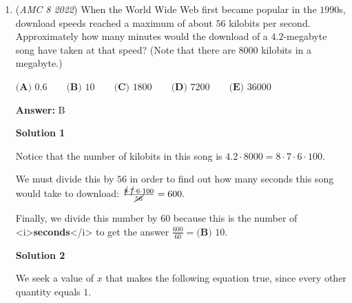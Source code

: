 \begin{enumerate}
Let the smallest number be $x$. Because $x$ and $4x$ are equally spaced from $15$, $15$ must be the average. By adding $x$ and $4x$ and dividing by $2$, we get that the mean is also $2.5x$. We get that $2.5x=15$, and solving gets $x=\boxed{\textbf{(C) } 6}$.

 



\textbf{Solution 4}

Since the problem is giving us the options, we can try all of them. The differences MUST be equal because the numbers have to be evenly spaced on the number line. We see that 4 cannot work because 15 - 4 = 11, and 4 * 4 = 16. 16 - 15 is not 11, so this option does not work. Next, we can try 5. We see that this also does not work because 15 - 5 = 10, and 5 * 4 = 20. 20 - 15 = 5, and this is not 10. We can then try 6 to see that it does work. 15 - 6 = 9, and 6 * 4 = 24. 24 - 15 = 9. The differences are equivalent, so we can see that 6 indeed does work. Therefore, the answer is $\boxed{\textbf{(C)} ~6}$.

 


	\item (\textit{AMC 8 2022}) When the World Wide Web first became popular in the $1990$s, download speeds reached a maximum of about $56$ kilobits per second. Approximately how many minutes would the download of a $4.2$-megabyte song have taken at that speed? (Note that there are $8000$ kilobits in a megabyte.)


 $\textbf{(A) } 0.6 \qquad \textbf{(B) } 10 \qquad \textbf{(C) } 1800 \qquad \textbf{(D) } 7200 \qquad \textbf{(E) } 36000$

 \textbf{Answer: }B



\textbf{Solution 1}

Notice that the number of kilobits in this song is $4.2 \cdot 8000 = 8 \cdot 7 \cdot 6 \cdot 100.$

 We must divide this by $56$ in order to find out how many seconds this song would take to download: $\frac{\cancel{8}\cdot\cancel{7}\cdot6\cdot100}{\cancel{56}} = 600.$

 Finally, we divide  this number by $60$ because this is the number of <i>\textbf{seconds}</i> to get the answer $\frac{600}{60}=\boxed{\textbf{(B) } 10}.$




\textbf{Solution 2}

We seek a value of $x$ that makes the following equation true, since every other quantity equals $1$.


\end{enumerate}
